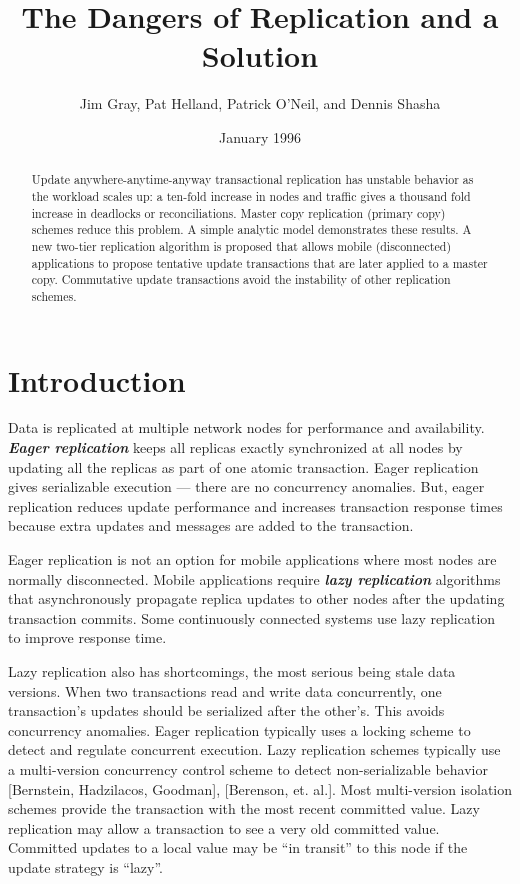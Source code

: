 \documentclass[a4paper,12pt,twoside,openright]{article}
\title{The Dangers of Replication and a Solution}
\author{Jim Gray, Pat Helland, Patrick O'Neil, and Dennis Shasha}
\date{January 1996}
\begin{document}
\maketitle

\begin{abstract}

Update anywhere-anytime-anyway transactional
replication has unstable behavior as the workload scales up: a ten-fold
increase in nodes and traffic gives a thousand fold increase in
deadlocks or reconciliations. Master copy replication (primary copy)
schemes reduce this problem. A simple analytic model demonstrates these
results. A new two-tier replication algorithm is proposed that allows
mobile (disconnected) applications to propose tentative update
transactions that are later applied to a master copy. Commutative update
transactions avoid the instability of other replication schemes.

\end{abstract}

\section{Introduction}

Data is replicated at multiple network nodes for performance and
availability. \emph{\textbf{Eager replication}} keeps all replicas
exactly synchronized at all nodes by updating all the replicas as part
of one atomic transaction. Eager replication gives serializable
execution --- there are no concurrency anomalies. But, eager replication
reduces update performance and increases transaction response times
because extra updates and messages are added to the transaction.

Eager replication is not an option for mobile applications where most
nodes are normally disconnected. Mobile applications require
\emph{\textbf{lazy replication}} algorithms that asynchronously
propagate replica updates to other nodes after the updating transaction
commits. Some continuously connected systems use lazy replication to
improve response time.

Lazy replication also has shortcomings, the most serious being stale
data versions. When two transactions read and write data concurrently,
one transaction's updates should be serialized after the other's. This
avoids concurrency anomalies. Eager replication typically uses a locking
scheme to detect and regulate concurrent execution. Lazy replication
schemes typically use a multi-version concurrency control scheme to
detect non-serializable behavior {[}Bernstein, Hadzilacos, Goodman{]},
{[}Berenson, et. al.{]}. Most multi-version isolation schemes provide
the transaction with the most recent committed value. Lazy replication
may allow a transaction to see a very old committed value. Committed
updates to a local value may be ``in transit'' to this node if the
update strategy is ``lazy''.
\end{document}
